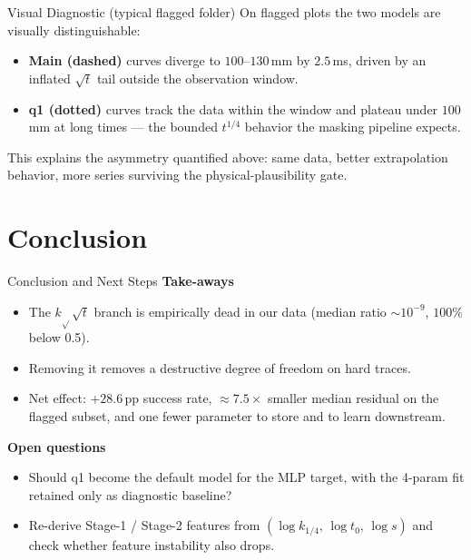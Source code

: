 \documentclass[UTF8,aspectratio=169]{ctexbeamer}
\begin{document}
\begin{frame}{Visual Diagnostic (typical flagged folder)}
On flagged plots the two models are visually distinguishable:
\begin{itemize}
  \item \textbf{Main (dashed)} curves diverge to $100$--$130\,$mm by $2.5\,$ms,
        driven by an inflated $\sqrt{t}$ tail outside the observation window.
  \item \textbf{q1 (dotted)} curves track the data within the window and
        plateau under $100\,$mm at long times --- the bounded $t^{1/4}$
        behavior the masking pipeline expects.
\end{itemize}
This explains the asymmetry quantified above: same data, better extrapolation
behavior, more series surviving the physical-plausibility gate.
\end{frame}

\section{Conclusion}

\begin{frame}{Conclusion and Next Steps}
\textbf{Take-aways}
\begin{itemize}
  \item The $k_{\sqrt{}}\sqrt{t}$ branch is empirically dead in our data
        (median ratio $\sim 10^{-9}$, $100\%$ below 0.5).
  \item Removing it removes a destructive degree of freedom on hard traces.
  \item Net effect: $+28.6\,\text{pp}$ success rate, $\approx 7.5\times$ smaller
        median residual on the flagged subset, and one fewer parameter to
        store and to learn downstream.
\end{itemize}

\vspace{0.5em}
\textbf{Open questions}
\begin{itemize}
  \item Should q1 become the default model for the MLP target, with the
        4-param fit retained only as diagnostic baseline?
  \item Re-derive Stage-1 / Stage-2 features from $(\log k_{1/4},\,\log t_0,\,
        \log s)$ and check whether feature instability also drops.
\end{itemize}
\end{frame}
\end{document}
